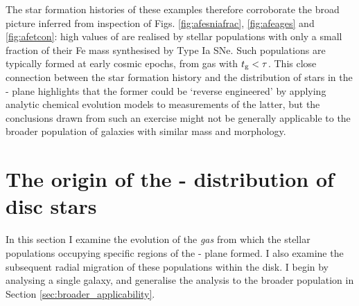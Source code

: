 The star formation histories of these examples therefore corroborate the broad picture inferred from inspection of Figs. \ref{fig:afesniafrac}, \ref{fig:afeages} and \ref{fig:afetcon}: high values of \afe{} are realised by stellar populations with only a small fraction of their Fe mass synthesised by Type Ia SNe. Such populations are typically formed at early cosmic epochs, from gas with $t_{\rm g} < \tau$. This close connection between the star formation history and the distribution of stars in the \afe{}-\feh{} plane highlights that the former could be `reverse engineered' by applying analytic chemical evolution models to measurements of the latter, but the conclusions drawn from such an exercise might not be generally applicable to the broader population of galaxies with similar mass and morphology. 

\section{The origin of the \afe{}-\feh{} distribution of disc stars}
\label{sec:afeorigin}

In this section I examine the evolution of the \emph{gas} from which the stellar populations occupying specific regions of the \afe{}-\feh{} plane formed. I also examine the subsequent radial migration of these populations within the disk. I begin by analysing a single galaxy, and generalise the analysis to the broader population in Section \ref{sec:broader_applicability}.

